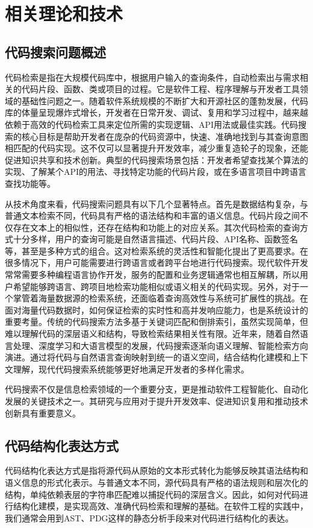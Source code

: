 \documentclass[UTF8,a4paper,12pt]{ctexart}
\numberwithin{equation}{section}
\begin{document}
\newpage
{}

\section{相关理论和技术}
\subsection{代码搜索问题概述}
代码检索是指在大规模代码库中，根据用户输入的查询条件，自动检索出与需求相关的代码片段、函数、类或项目的过程。它是软件工程、程序理解与开发者工具领域的基础性问题之一。随着软件系统规模的不断扩大和开源社区的蓬勃发展，代码库的体量呈现爆炸式增长，开发者在日常开发、调试、复用和学习过程中，越来越依赖于高效的代码检索工具来定位所需的实现逻辑、API用法或最佳实践。代码搜索的核心目标是帮助开发者在庞杂的代码资源中，快速、准确地找到与其查询意图相匹配的代码实现。这不仅可以显著提升开发效率，减少重复造轮子的现象，还能促进知识共享和技术创新。典型的代码搜索场景包括：开发者希望查找某个算法的实现、了解某个API的用法、寻找特定功能的代码片段，或在多语言项目中跨语言查找功能等。\par 
从技术角度来看，代码搜索问题具有以下几个显著特点。首先是数据结构复杂，与普通文本检索不同，代码具有严格的语法结构和丰富的语义信息。代码片段之间不仅存在文本上的相似性，还存在结构和功能上的对应关系。其次代码检索的查询方式十分多样，用户的查询可能是自然语言描述、代码片段、API名称、函数签名等，甚至是多种方式的组合。这对检索系统的灵活性和智能化提出了更高要求。在很多情况下，用户可能需要进行跨语言或者跨平台地进行代码搜索。现代软件开发常常需要多种编程语言协作开发，服务的配置和业务逻辑通常也相互解耦，所以用户希望能够跨语言、跨项目地检索功能相似或语义相关的代码实现。另外，对于一个掌管着海量数据源的检索系统，还面临着查询高效性与系统可扩展性的挑战。在面对海量代码数据时，如何保证检索的实时性和高并发响应能力，也是系统设计的重要考量。传统的代码搜索方法多基于关键词匹配和倒排索引，虽然实现简单，但难以理解代码的深层语义和结构，导致检索结果相关性有限。近年来，随着自然语言处理、深度学习和大语言模型的发展，代码搜索逐渐向语义理解、智能检索方向演进。通过将代码与自然语言查询映射到统一的语义空间，结合结构化建模和上下文理解，现代代码搜索系统能够更好地满足开发者的多样化需求。\par
代码搜索不仅是信息检索领域的一个重要分支，更是推动软件工程智能化、自动化发展的关键技术之一。其研究与应用对于提升开发效率、促进知识复用和推动技术创新具有重要意义。
\subsection{代码结构化表达方式}
代码结构化表达方式是指将源代码从原始的文本形式转化为能够反映其语法结构和语义信息的形式化表示。与普通文本不同，源代码具有严格的语法规则和层次化的结构，单纯依赖表层的字符串匹配难以捕捉代码的深层含义。因此，如何对代码进行结构化建模，是实现高效、准确代码检索和理解的基础。在软件工程的实践中，我们通常会用到AST、PDG这样的静态分析手段来对代码进行结构化的表达。
\end{document}
